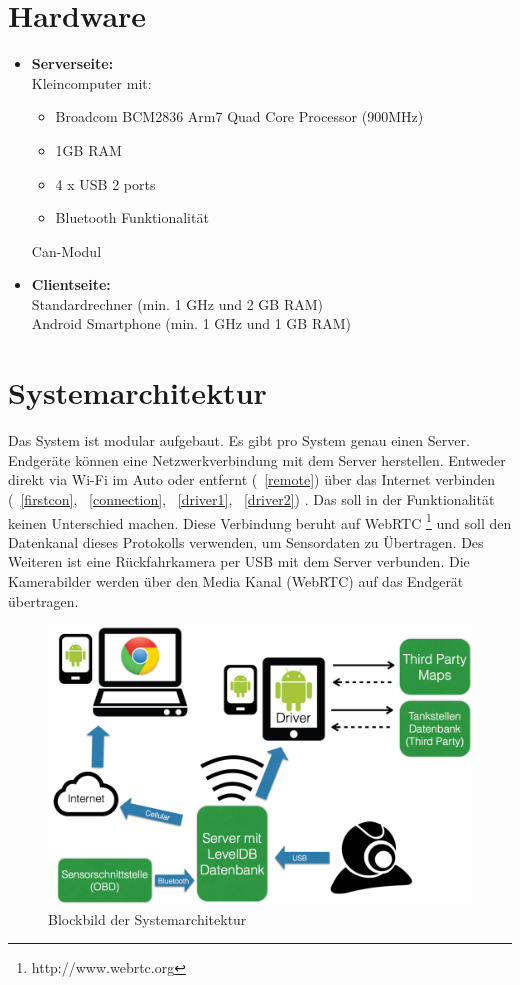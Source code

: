 \documentclass[pflichtenheft.tex]{subfiles}
\begin{document}
\section{Hardware}
\begin{itemize}
\item
\textbf{Serverseite:}\\
Kleincomputer mit:
\begin{itemize}
\item
Broadcom BCM2836 Arm7 Quad Core Processor (900MHz)
\item
1GB RAM
\item
4 x USB 2 ports
\item
Bluetooth Funktionalität
\end{itemize}
Can-Modul
\item
\textbf{Clientseite:}\\
Standardrechner (min. 1 GHz und 2 GB RAM)\\
Android Smartphone (min. 1 GHz und 1 GB RAM)
\end{itemize}


\newpage
\section{Systemarchitektur}

Das System ist modular aufgebaut. Es gibt pro System genau einen Server. Endgeräte können eine Netzwerkverbindung mit dem Server herstellen. Entweder direkt via Wi-Fi im Auto oder entfernt (~\ref{remote}) über das Internet verbinden (~\ref{firstcon}, ~\ref{connection}, ~\ref{driver1}, ~\ref{driver2}) . Das soll in der Funktionalität keinen Unterschied machen. Diese Verbindung beruht auf WebRTC \footnote{http://www.webrtc.org} und soll den Datenkanal dieses Protokolls verwenden, um Sensordaten zu Übertragen. Des Weiteren ist eine Rückfahrkamera per USB mit dem Server verbunden. Die Kamerabilder werden über den Media Kanal (WebRTC) auf das Endgerät übertragen.

\begin{figure}[H]
  	\begin{center}
 		\includegraphics[width=\textwidth]{Images/sysarch.png}
  		\caption{Blockbild der Systemarchitektur}
  	\end{center}
\end{figure}
\end{document}
